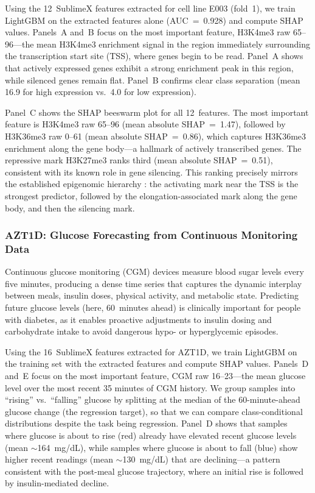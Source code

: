 \documentclass[times, review, 10pt]{elsarticle}
\begin{document}
Using the 12~SublimeX features extracted for cell line E003
(fold~1), we train LightGBM on the extracted features alone
(AUC~=~0.928) and compute SHAP values.
Panels~A and~B focus on the most important feature,
H3K4me3 raw 65--96---the mean H3K4me3 enrichment signal
in the region immediately surrounding the transcription
start site (TSS), where genes begin to be read. Panel~A
shows that actively expressed genes exhibit a strong
enrichment peak in this region, while silenced genes remain
flat. Panel~B confirms clear class separation (mean 16.9
for high expression vs.\ 4.0 for low expression).

Panel~C shows the SHAP beeswarm plot for all 12~features.
The most important feature is H3K4me3 raw 65--96
(mean absolute SHAP~=~1.47), followed by H3K36me3 raw
0--61 (mean absolute SHAP~=~0.86), which captures
H3K36me3 enrichment along the gene body---a hallmark of
actively transcribed genes. The repressive mark H3K27me3
ranks third (mean absolute SHAP~=~0.51), consistent
with its known role in gene silencing. This ranking
precisely mirrors the established epigenomic hierarchy
\cite{karlic2010histone, howe2017h3k4me3}: the activating
mark near the TSS is the strongest predictor, followed by
the elongation-associated mark along the gene body, and
then the silencing mark.

\subsubsection{AZT1D: Glucose Forecasting from
Continuous Monitoring Data}

Continuous glucose monitoring (CGM) devices measure blood
sugar levels every five minutes, producing a dense time
series that captures the dynamic interplay between meals,
insulin doses, physical activity, and metabolic state.
Predicting future glucose levels (here, 60~minutes ahead)
is clinically important for people with diabetes, as it
enables proactive adjustments to insulin dosing and
carbohydrate intake to avoid dangerous hypo- or
hyperglycemic episodes.

Using the 16~SublimeX features extracted for AZT1D, we train LightGBM on the training set with the extracted features and compute SHAP values. Panels~D and~E
focus on the most important feature, CGM raw 16--23---the mean glucose level over the most recent 35 minutes of CGM history.
We group samples into ``rising'' vs.\ ``falling'' glucose by splitting at the
median of the 60-minute-ahead glucose change (the regression target), so that
we can compare class-conditional distributions despite the task being regression.
Panel~D shows that samples where glucose is about to rise (red) already have elevated recent glucose levels
(mean ${\sim}$164~mg/dL), while samples where glucose
is about to fall (blue) show higher recent readings
(mean ${\sim}$130~mg/dL) that are declining---a pattern
consistent with the post-meal glucose trajectory, where an
initial rise is followed by insulin-mediated decline.
\end{document}
